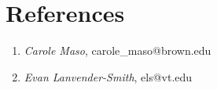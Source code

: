     \section{References}


    \begin{enumerate}
    
    \item \emph{Carole Maso}, carole\_maso@brown.edu \\
    \item \emph{Evan Lanvender-Smith}, els@vt.edu\\
 
 
 \end{enumerate}
